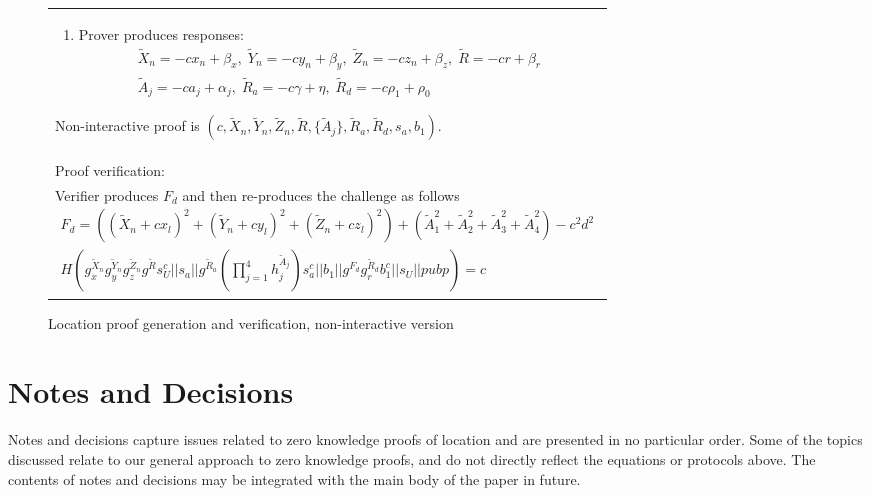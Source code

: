 \documentclass{article}
\begin{document}
\begin{figure}[!htb]
\begin{tabular}{|p{\linewidth}|}
\begin{enumerate}
\item
  Prover produces responses:
\begin{multline}
  \tilde X_n = -c x_n + \beta_x,  \;
  \tilde Y_n = -c y_n + \beta_y,  \;
  \tilde Z_n = -c z_n + \beta_z,   \;
  \tilde R = -c r + \beta_r   \\
  \tilde A_j = -c a_j + \alpha_j, \;
  \tilde R_a = -c \gamma + \eta,   \;
  \tilde R_d = -c \rho_1 + \rho_0
\end{multline}
\end{enumerate}
Non-interactive proof is
$(c, \tilde X_n, \tilde Y_n, \tilde Z_n, \tilde R, \{\tilde A_j\}, \tilde R_a, \tilde R_d, s_a, b_1)$.
\\
Proof verification:\\
Verifier produces $F_d$ and then re-produces the challenge as follows
%
\begin{multline}
\label{verf-chash}
  F_d = ((\tilde X_n + c x_l)^2 + (\tilde Y_n + c y_l)^2 + (\tilde Z_n + c z_l)^2) + (\tilde A_1^2 + \tilde A_2^2 + \tilde A_3^2 + \tilde A_4^2) - c^2 d^2 \\
  H(g_x^{\tilde X_n} g_y^{\tilde Y_n} g_z^{\tilde Z_n} g^{\tilde R} s_U^{c} ||
    s_a ||
    g^{\tilde R_a} (\prod_{j=1}^4 h_j^{\tilde A_j}) s_a^{c} ||
    b_1 ||
    g^{F_d} g_r^{\tilde R_d} b_1^c ||
    s_U ||
    pubp)
  = c
\end{multline}
\\
\hline
\end{tabular}
\caption{Location proof generation and verification, non-interactive version}
\label{ni_fig}
\end{figure}



\section{Notes and Decisions}

Notes and decisions capture issues related to zero knowledge proofs of location and are presented in no particular order.
Some of the topics discussed relate to our general approach to zero knowledge proofs, and do not directly reflect the equations or protocols above.
The contents of notes and decisions may be integrated with the main body of the paper in future. 
\end{document}
